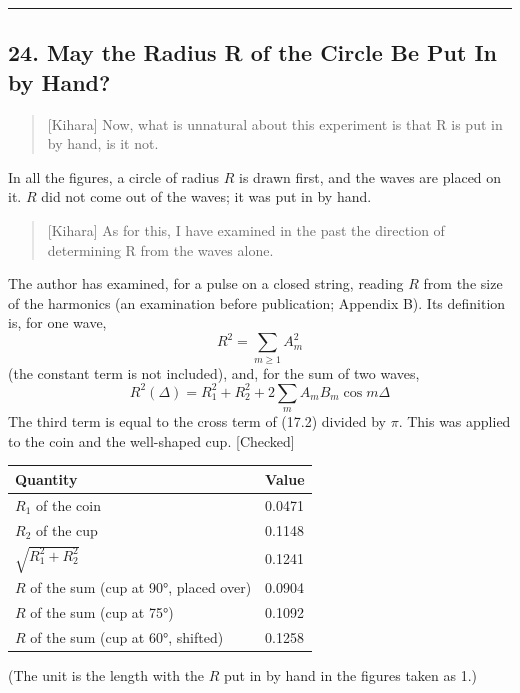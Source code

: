 \documentclass[
  a4paper,
]{article}
\newcounter{none} %
\begin{document}
\begin{center}\rule{0.5\linewidth}{0.5pt}\end{center}

\subsection{24. May the Radius R of the Circle Be Put In by
Hand?}\label{may-the-radius-r-of-the-circle-be-put-in-by-hand}

\begin{quote}
{[}Kihara{]} Now, what is unnatural about this experiment is that R is
put in by hand, is it not.
\end{quote}

In all the figures, a circle of radius \(R\) is drawn first, and the
waves are placed on it. \(R\) did not come out of the waves; it was put
in by hand.

\begin{quote}
{[}Kihara{]} As for this, I have examined in the past the direction of
determining R from the waves alone.
\end{quote}

The author has examined, for a pulse on a closed string, reading \(R\)
from the size of the harmonics (an examination before publication;
Appendix B). Its definition is, for one wave, \[
R^2 = \sum_{m\ge1} A_m^2 \tag{24.1}
\] (the constant term is not included), and, for the sum of two waves,
\[
R^2(\Delta) = R_1^2 + R_2^2 + 2\sum_m A_m B_m\cos m\Delta \tag{24.2}
\] The third term is equal to the cross term of (17.2) divided by
\(\pi\). This was applied to the coin and the well-shaped cup.
{[}Checked{]}

{\def\LTcaptype{none} %
\begin{longtable}[]{@{}ll@{}}
\toprule\noalign{}
Quantity & Value \\
\midrule\noalign{}
\endhead
\bottomrule\noalign{}
\endlastfoot
\(R_1\) of the coin & 0.0471 \\
\(R_2\) of the cup & 0.1148 \\
\(\sqrt{R_1^2+R_2^2}\) & 0.1241 \\
\(R\) of the sum (cup at 90°, placed over) & 0.0904 \\
\(R\) of the sum (cup at 75°) & 0.1092 \\
\(R\) of the sum (cup at 60°, shifted) & 0.1258 \\
\end{longtable}
}

(The unit is the length with the \(R\) put in by hand in the figures
taken as 1.)
\end{document}

